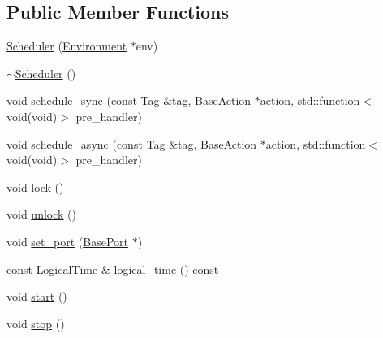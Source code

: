\subsection*{Public Member Functions}
\begin{DoxyCompactItemize}
\item 
\hyperlink{classreactor_1_1Scheduler_a58fbbd0e02d4fc8ef0bcf9330d010c2e}{Scheduler} (\hyperlink{classreactor_1_1Environment}{Environment} $\ast$env)
\item 
\hyperlink{classreactor_1_1Scheduler_ad6f0cfcd7f07fa81392ab62f172fbd68}{$\sim$\+Scheduler} ()
\item 
void \hyperlink{classreactor_1_1Scheduler_ab77f16103f0eb0631886805bc94f231c}{schedule\+\_\+sync} (const \hyperlink{classreactor_1_1Tag}{Tag} \&tag, \hyperlink{classreactor_1_1BaseAction}{Base\+Action} $\ast$action, std\+::function$<$ void(void)$>$ pre\+\_\+handler)
\item 
void \hyperlink{classreactor_1_1Scheduler_a1ca117318ce71ab3c63b7b8160d413af}{schedule\+\_\+async} (const \hyperlink{classreactor_1_1Tag}{Tag} \&tag, \hyperlink{classreactor_1_1BaseAction}{Base\+Action} $\ast$action, std\+::function$<$ void(void)$>$ pre\+\_\+handler)
\item 
void \hyperlink{classreactor_1_1Scheduler_a970ac74510f7cce25fd7e9994b11dad6}{lock} ()
\item 
void \hyperlink{classreactor_1_1Scheduler_a8787186c85529782cf95fd58050f3af2}{unlock} ()
\item 
void \hyperlink{classreactor_1_1Scheduler_a344df614ab8590273a2682eed1d7aa12}{set\+\_\+port} (\hyperlink{classreactor_1_1BasePort}{Base\+Port} $\ast$)
\item 
const \hyperlink{classreactor_1_1LogicalTime}{Logical\+Time} \& \hyperlink{classreactor_1_1Scheduler_a347fccd0368f7d36b8b9a13fec647f03}{logical\+\_\+time} () const
\item 
void \hyperlink{classreactor_1_1Scheduler_a2366bac3be216dbba49e110a69250ece}{start} ()
\item 
void \hyperlink{classreactor_1_1Scheduler_a0ef1f93067b868fcf0c26031b7567054}{stop} ()
\end{DoxyCompactItemize}
